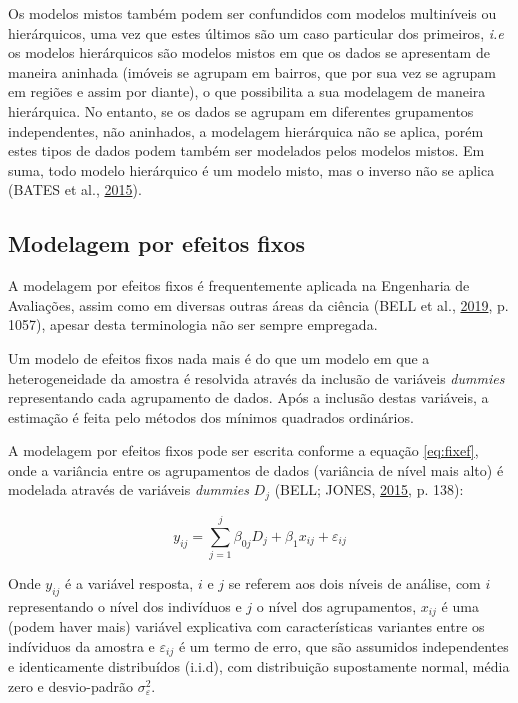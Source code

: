 \documentclass[
  a4paper, 11pt]{article}
\begin{document}
Os modelos mistos também podem ser confundidos com modelos multiníveis
ou hierárquicos, uma vez que estes últimos são um caso particular dos
primeiros, \emph{i.e} os modelos hierárquicos são modelos mistos em que
os dados se apresentam de maneira aninhada (imóveis se agrupam em
bairros, que por sua vez se agrupam em regiões e assim por diante), o
que possibilita a sua modelagem de maneira hierárquica. No entanto, se
os dados se agrupam em diferentes grupamentos independentes, não
aninhados, a modelagem hierárquica não se aplica, porém estes tipos de
dados podem também ser modelados pelos modelos mistos. Em suma, todo
modelo hierárquico é um modelo misto, mas o inverso não se aplica (BATES
et al., \protect\hyperlink{ref-Bates}{2015}).

\hypertarget{modelagem-por-efeitos-fixos}{%
\subsection{Modelagem por efeitos
fixos}\label{modelagem-por-efeitos-fixos}}

A modelagem por efeitos fixos é frequentemente aplicada na Engenharia de
Avaliações, assim como em diversas outras áreas da ciência (BELL et al.,
\protect\hyperlink{ref-bell2019}{2019}, p. 1057), apesar desta
terminologia não ser sempre empregada.

Um modelo de efeitos fixos nada mais é do que um modelo em que a
heterogeneidade da amostra é resolvida através da inclusão de variáveis
\emph{dummies} representando cada agrupamento de dados. Após a inclusão
destas variáveis, a estimação é feita pelo métodos dos mínimos quadrados
ordinários.

A modelagem por efeitos fixos pode ser escrita conforme a equação
\ref{eq:fixef}, onde a variância entre os agrupamentos de dados
(variância de nível mais alto) é modelada através de variáveis
\emph{dummies} \(D_j\) (BELL; JONES,
\protect\hyperlink{ref-bell2015}{2015}, p. 138):

\begin{equation} \label{eq:fixef}
y_{ij} = \sum_{j=1}^{j}\beta_{0j}D_j + \beta_1 x_{ij} + \varepsilon_{ij}
\end{equation}

Onde \(y_{ij}\) é a variável resposta, \(i\) e \(j\) se referem aos dois
níveis de análise, com \(i\) representando o nível dos indivíduos e
\(j\) o nível dos agrupamentos, \(x_{ij}\) é uma (podem haver mais)
variável explicativa com características variantes entre os indíviduos
da amostra e \(\varepsilon_{ij}\) é um termo de erro, que são assumidos
independentes e identicamente distribuídos (i.i.d), com distribuição
supostamente normal, média zero e desvio-padrão
\(\sigma_{\varepsilon}^2\).
\end{document}
